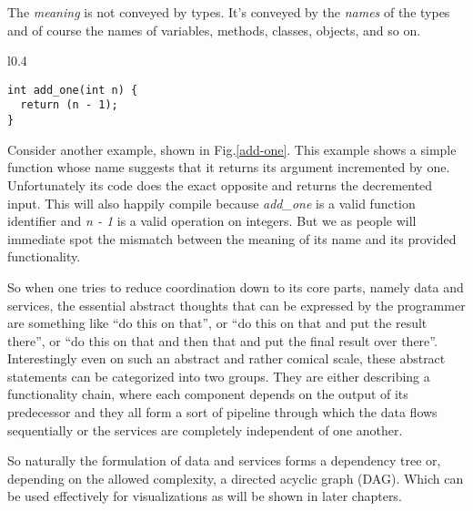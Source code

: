 The \textit{meaning} is not conveyed by types. It's conveyed
by the \textit{names} of the types and of course the names of
variables, methods, classes, objects, and so on.
\newline

\begin{wrapfigure}{l}{0.4\textwidth}
  \begin{lstlisting}
int add_one(int n) {
  return (n - 1);
}
  \end{lstlisting}
  \caption{Example showing a bug that cannot be detected by
           the compiler or type checker.}
  \label{add-one}
\end{wrapfigure}

Consider another example, shown in Fig.\ref{add-one}. This example
shows a simple function whose name suggests that it returns its
argument incremented by one. Unfortunately its code does the exact
opposite and returns the decremented input. This will also
happily compile because \textit{add\_one} is a valid function identifier
and \textit{n - 1} is a valid operation on integers. But we as people
will immediate spot the mismatch between the meaning of its name and
its provided functionality.

So when one tries to reduce coordination down to its core parts,
namely data and services, the essential abstract thoughts that can
be expressed by the programmer are something like ``do this on that'',
or ``do this on that and put the result there'', or ``do this
on that and then that and put the final result over there''.
Interestingly even on such an abstract and rather comical scale,
these abstract statements can be categorized into two groups.
They are either describing a functionality chain, where each
component depends on the output of its predecessor and they
all form a sort of pipeline through which the data flows
sequentially or the services are completely independent of
one another.

So naturally the formulation of data and services forms a
dependency tree or, depending on the allowed complexity,
a directed acyclic graph (DAG). Which can be used effectively
for visualizations as will be shown in later chapters.
